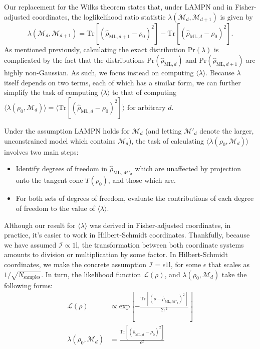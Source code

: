 \documentclass[aps,pra, twocolumn]{revtex4-1}
\newcommand{\M}{\mathcal{M}}
\newcommand{\Id}{\mathbb{I}}
\def\Id{1\!\mathrm{l}}
\newcommand{\rhohat}{\hat{\rho}}
\newcommand{\rhoML}[1]{\rhohat_{\scriptscriptstyle{\mathrm{ML},#1}}}
\begin{document}
Our replacement for the Wilks theorem states that, under LAMPN and in Fisher-adjusted coordinates, the loglikelihood ratio statistic $\lambda(\M_{d}, \M_{d+1})$ is given by
\begin{equation}
\label{eq:llrs}
\lambda(\M_{d}, \M_{d+1}) = \mathrm{Tr}[(\rhoML{d+1}  - \rho_{0})^{2}] - \mathrm{Tr}[(\rhoML{d} - \rho_{0})^{2}].
\end{equation}
As mentioned previously, calculating the exact distribution $\mathrm{Pr}(\lambda)$ is complicated by the fact that the distributions $\mathrm{Pr}(\rhoML{d})$ and $\mathrm{Pr}(\rhoML{d+1})$ are highly non-Gaussian. As such, we focus instead on computing $\langle \lambda \rangle$.
Because $\lambda$ itself depends on two terms, each of which has a similar form, we can further simplify the task of computing $\langle \lambda \rangle$ to that of computing $\langle \lambda(\rho_{0}, \M_{d}) \rangle = \langle \mathrm{Tr}[(\rhoML{d}  - \rho_{0})^{2}] \rangle$ for arbitrary $d$.

Under the assumption LAMPN holds for $\M_{d}$ (and letting $\M'_{d}$ denote the larger, unconstrained model which contains $\M_{d}$), the task of calculating $\langle \lambda(\rho_{0}, \M_{d})\rangle$ involves two main steps:
\begin{itemize}
\item Identify degrees of freedom in $\rhoML{\M'_{d}}$ which are unaffected by projection onto the tangent cone $T(\rho_{0})$, and those which are.
\item For both sets of degrees of freedom, evaluate the contributions of each degree of freedom to the value of $\langle \lambda \rangle$.
\end{itemize}

Although our result for $\langle \lambda \rangle$ was derived in Fisher-adjusted coordinates, in practice, it's easier to work in Hilbert-Schmidt coordinates. Thankfully, because we have assumed $\mathcal{I} \propto \Id$, the transformation between both coordinate systems amounts to division or multiplication by some factor. In Hilbert-Schmidt coordinates, we make the concrete assumption $\mathcal{I} = \epsilon \Id$, for some $\epsilon$ that scales as $1/\sqrt{N_{\mathrm{samples}}}$. In turn, the likelihood function $\mathcal{L}(\rho)$, and $\lambda(\rho_{0},\M_{d})$ take the following forms:
\begin{align*}
\mathcal{L}(\rho) &\propto \text{exp}\left[-\frac{\mathrm{Tr}[(\rho - \rhoML{\M'_{d}})^{2}]}{2\epsilon^{2}}\right]\\
\lambda(\rho_{0}, \M_{d}) &=\frac{\mathrm{Tr}[(\rhoML{d}  - \rho_{0})^{2}]}{\epsilon^{2}}
\end{align*}
\end{document}

